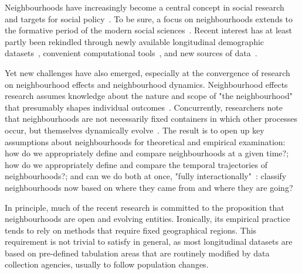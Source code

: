 
Neighbourhoods have increasingly become a central concept in social research and
targets for social
policy~\citep{sampson2012great,galster2019making,stone2015urban,looker2015nation}.
To be sure, a focus on neighbourhoods extends to the formative period of the
modern social sciences~\citep{Abbott1997}. Recent interest has at least partly
been rekindled through newly available longitudinal demographic
datasets~\citep{Logan2014,nhgis}, convenient computational
tools~\citep{rey2018spatio}, and new sources of data~\citep{Poorthuis2018}.


Yet new challenges have also emerged, especially at the convergence of research
on neighbourhood effects and neighbourhood dynamics. Neighbourhood effects
research assumes knowledge about the nature and scope of "the neighbourhood"
that presumably shapes individual outcomes~\citep{Kwan2018,Shelton2019}.
Concurrently, researchers note that neighbourhoods are not necessarily fixed
containers in which other processes occur, but themselves dynamically
evolve~\citep{Delmelle2017,Reades2019,li2018new}.  The result is to open up key
assumptions about neighbourhoods for theoretical and empirical examination: how
do we appropriately define and compare neighbourhoods at a given time?; how do
we appropriately define and compare the temporal trajectories of
neighbourhoods?; and can we do both at once, "fully
interactionally"~\citep{Abbott1997}: classify neighbourhoods now based on where
they came from and where they are going? 


In principle, much of the recent research is committed to the proposition that
neighbourhoods are open and evolving entities. Ironically, its empirical
practice tends to rely on methods that require fixed geographical regions. This
requirement is not trivial to satisfy in general, as most longitudinal datasets
are based on pre-defined tabulation areas that are routinely modified by data
collection agencies, usually to follow population changes. 

